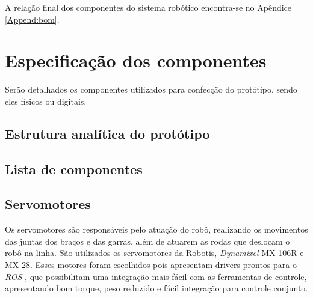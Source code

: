 
A relação final dos componentes do sistema robótico encontra-se no Apêndice \ref{Append:bom}.

\section{Especificação dos componentes}
\label{sec:espc}
Serão detalhados os componentes utilizados para confecção do protótipo, sendo eles físicos ou digitais.

\subsection{Estrutura analítica do protótipo}
\label{ssec:pbs}



\subsection{Lista de componentes}
\label{ssec:list}

\subsection{Servomotores}
Os servomotores são responsáveis pelo atuação do robô, realizando os movimentos das juntas dos braços e das garras, além de atuarem as rodas que deslocam o robô na linha. São utilizados os servomotores da Robotis, \textit{Dynamixel} MX-106R e MX-28. Esses motores foram escolhidos pois apresentam drivers prontos para o \textit{ROS} , que possibilitam uma integração mais fácil com as ferramentas de controle, apresentando bom torque, peso reduzido e fácil integração para controle conjunto.

